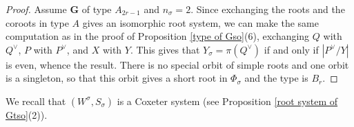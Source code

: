 \documentclass{amsart}
\numberwithin{equation}{section}
\theoremstyle{definition}
\theoremstyle{remark}
\newcommand\bG{{\mathbf G}}
\begin{document}
\begin{proof}
Assume $\bG$ of type $A_{2r-1}$ and $n_\sigma=2$.
Since exchanging the roots and the coroots in type $A$ gives an isomorphic
root system, we can make the same computation as in the proof of Proposition
\ref{type of Gso}(6), exchanging $Q$ with $Q^\vee$,  $P$ with $P^\vee$,
and $X$ with $Y$. This gives that $Y_\sigma=\pi(Q^\vee)$ if and only if 
$|P^\vee/Y|$ is even, whence the result. There is no special orbit of simple roots 
and one orbit is a singleton, so that this orbit gives a short root in $\Phi_\sigma$
and the type is $B_r$.
\end{proof}

We recall that
$(W^\sigma,S_\sigma)$ is a Coxeter system (see Proposition \ref{root system of Gtso}(2)).
\end{document}

